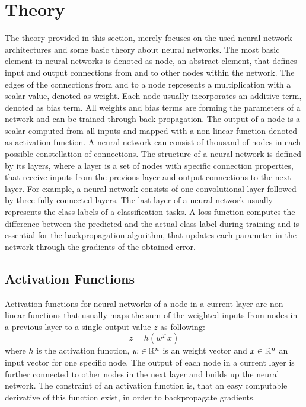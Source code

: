 
\section{Theory}\label{sec:nn_theory}
\thesisStateRevised
The theory provided in this section, merely focuses on the used neural network architectures and some basic theory about neural networks.
The most basic element in neural networks is denoted as node, an abstract element, that defines input and output connections from and to other nodes within the network.
The edges of the connections from and to a node represents a multiplication with a scalar value, denoted as weight.
Each node usually incorporates an additive term, denoted as bias term.
All weights and bias terms are forming the parameters of a network and can be trained through back-propagation.
The output of a node is a scalar computed from all inputs and mapped with a non-linear function denoted as activation function.
A neural network can consist of thousand of nodes in each possible constellation of connections.
The structure of a neural network is defined by its layers, where a layer is a set of nodes with specific connection properties, that receive inputs from the previous layer and output connections to the next layer.
For example, a neural network consists of one convolutional layer followed by three fully connected layers.
The last layer of a neural network usually represents the class labels of a classification tasks.
A loss function computes the difference between the predicted and the actual class label during training and is essential for the backpropagation algorithm, that updates each parameter in the network through the gradients of the obtained error.



\subsection{Activation Functions}\label{sec:nn_theory_acti}
Activation functions for neural networks of a node in a current layer are non-linear functions that usually maps the sum of the weighted inputs from nodes in a previous layer to a single output value $z$ as following:
\begin{equation}\label{eq:nn_theory_acti}
  z = h(w^T \, x)
\end{equation}
where $h$ is the activation function, $w \in \mathbb{R}^n$ is an weight vector and $x \in \mathbb{R}^n$ an input vector for one specific node.
The output of each node in a current layer is further connected to other nodes in the next layer and builds up the neural network.
The constraint of an activation function is, that an easy computable derivative of this function exist, in order to backpropagate gradients.

